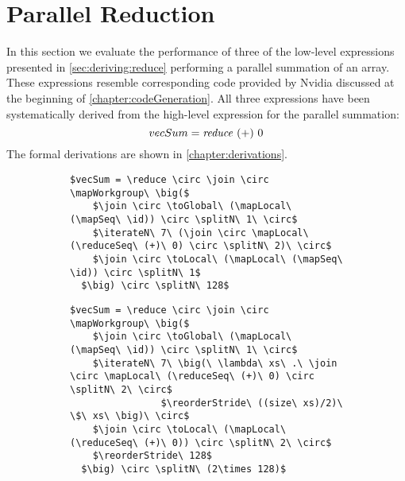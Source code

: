 \section{Parallel Reduction}
In this section we evaluate the performance of three of the low-level expressions presented in \autoref{sec:deriving:reduce} performing a parallel summation of an array.
These expressions resemble corresponding \OpenCL code provided by Nvidia discussed at the beginning of \autoref{chapter:codeGeneration}.
All three expressions have been systematically derived from the high-level expression for the parallel summation:
\begin{equation*}
  vecSum = \text{\textit{reduce}}\ (+)\ 0
\end{equation*}
The formal derivations are shown in \autoref{chapter:derivations}.

\begin{figure*}[t]
\captionsetup[subfigure]{justification=justified,singlelinecheck=false}

\begin{subfigure}[b]{\linewidth}
\vspace{.4em}
\begin{minipage}{.05\linewidth}
\caption{}
\label{fig:reduce:expr:1}
\end{minipage}
\hfill
\begin{minipage}{.9\linewidth}
\begin{lstlisting}[mathescape, basicstyle=\small\rmfamily]
$vecSum = \reduce \circ \join \circ \mapWorkgroup\ \big($
    $\join \circ \toGlobal\ (\mapLocal\ (\mapSeq\ \id)) \circ \splitN\ 1\ \circ$
    $\iterateN\ 7\ (\join \circ \mapLocal\ (\reduceSeq\ (+)\ 0) \circ \splitN\ 2)\ \circ$
    $\join \circ \toLocal\ (\mapLocal\ (\mapSeq\ \id)) \circ \splitN\ 1$
  $\big) \circ \splitN\ 128$
\end{lstlisting}
\end{minipage}
\end{subfigure}

\begin{subfigure}[b]{\linewidth}
\vspace{0em}
\begin{minipage}{.05\linewidth}
\caption{}
\label{fig:reduce:expr:2}
\end{minipage}
\hfill
\begin{minipage}{.9\linewidth}
\begin{lstlisting}[mathescape, basicstyle=\small\rmfamily]
$vecSum = \reduce \circ \join \circ \mapWorkgroup\ \big($
    $\join \circ \toGlobal\ (\mapLocal\ (\mapSeq\ \id)) \circ \splitN\ 1\ \circ$
    $\iterateN\ 7\ \big(\ \lambda\ xs\ .\ \join \circ \mapLocal\ (\reduceSeq\ (+)\ 0) \circ \splitN\ 2\ \circ$
                $\reorderStride\ ((size\ xs)/2)\ \$\ xs\ \big)\ \circ$
    $\join \circ \toLocal\ (\mapLocal\ (\reduceSeq\ (+)\ 0)) \circ \splitN\ 2\ \circ$
    $\reorderStride\ 128$
  $\big) \circ \splitN\ (2\times 128)$
\end{lstlisting}
\end{minipage}
\end{subfigure}


\end{figure*}
